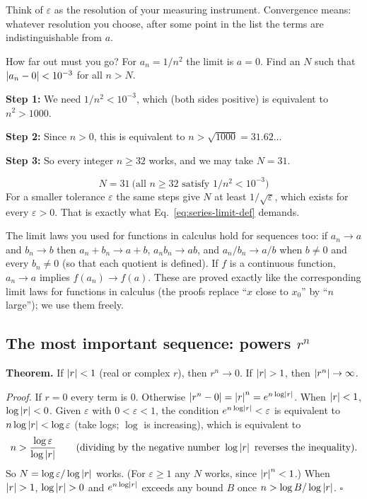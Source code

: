 Think of $\varepsilon$ as the resolution of your measuring instrument. Convergence means: whatever resolution you choose, after some point in the list the terms are indistinguishable from $a$.

\begin{sample}{How far out must you go?}
For $a_n=1/n^2$ the limit is $a=0$. Find an $N$ such that $\left\lvert a_n-0\right\rvert<10^{-3}$ for all $n>N$.

\textbf{Step 1:} We need $1/n^2<10^{-3}$, which (both sides positive) is equivalent to $n^2>1000$.

\textbf{Step 2:} Since $n>0$, this is equivalent to $n>\sqrt{1000}=31.62\ldots$

\textbf{Step 3:} So every integer $n\ge 32$ works, and we may take $N=31$.

\[\boxed{N=31\ \text{(all } n\ge 32 \text{ satisfy } 1/n^2<10^{-3})}\]
For a smaller tolerance $\varepsilon$ the same steps give $N$ at least $1/\sqrt{\varepsilon}$, which exists for every $\varepsilon>0$. That is exactly what Eq.~\eqref{eq:series-limit-def} demands.
\end{sample}

The limit laws you used for functions in calculus hold for sequences too: if $a_n\to a$ and $b_n\to b$ then $a_n+b_n\to a+b$, $a_nb_n\to ab$, and $a_n/b_n\to a/b$ when $b\ne0$ and every $b_n\ne0$ (so that each quotient is defined). If $f$ is a continuous function, $a_n\to a$ implies $f(a_n)\to f(a)$. These are proved exactly like the corresponding limit laws for functions in calculus (the proofs replace ``$x$ close to $x_0$'' by ``$n$ large''); we use them freely.

\subsection{The most important sequence: powers $r^n$}

\textbf{Theorem.} If $\left\lvert r\right\rvert<1$ (real or complex $r$), then $r^n\to0$. If $\left\lvert r\right\rvert>1$, then $\left\lvert r^n\right\rvert\to\infty$.

\emph{Proof.} If $r=0$ every term is $0$. Otherwise $\left\lvert r^n-0\right\rvert=\left\lvert r\right\rvert^n=e^{n\log\left\lvert r\right\rvert}$. When $\left\lvert r\right\rvert<1$, $\log\left\lvert r\right\rvert<0$. Given $\varepsilon$ with $0<\varepsilon<1$, the condition $e^{n\log\left\lvert r\right\rvert}<\varepsilon$ is equivalent to $n\log\left\lvert r\right\rvert<\log\varepsilon$ (take logs; $\log$ is increasing), which is equivalent to
\[
n>\frac{\log\varepsilon}{\log\left\lvert r\right\rvert}\qquad\text{(dividing by the negative number } \log\left\lvert r\right\rvert \text{ reverses the inequality)}.
\]
So $N=\log\varepsilon/\log\left\lvert r\right\rvert$ works. (For $\varepsilon\ge1$ any $N$ works, since $\left\lvert r\right\rvert^n<1$.) When $\left\lvert r\right\rvert>1$, $\log\left\lvert r\right\rvert>0$ and $e^{n\log\left\lvert r\right\rvert}$ exceeds any bound $B$ once $n>\log B/\log\left\lvert r\right\rvert$. $\square$

